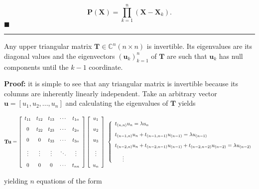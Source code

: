 \begin{equation} \mathbf{P}\left(\mathbf{X}\right) = \prod_{k=1}^n \left(\mathbf{X} - \mathbf{X}_k\right) .\end{equation}
\hfill$\blacksquare$
\vspace{5mm}
\hrule
\vspace{5mm} %
\begin{lemma}\label{lemma:triangular_inveritibility} %
	Any upper triangular matrix $\mathbf{T}\in\mathbb{C}^n{(n\times n)}$ is invertible. Its eigenvalues are its diagonal values and the eigenvectors $\left(\mathbf{u}_k\right)_{k=1}^n$ of $\mathbf{T}$ are such that $\mathbf{u}_k$ has null components until the $k-1$ coordinate.
\end{lemma}
\noindent\textbf{Proof:} it is simple to see that any triangular matrix is invertible because its columns are inherently linearly independent. Take an arbitrary vector $\mathbf{u} = \left[u_1,u_2,...,u_n\right]$ and calculating the eigenvalues of $\mathbf{T}$ yields

\begin{equation} \mathbf{Tu} = \left[\begin{array}{ccccc} t_{11} & t_{12} & t_{13} & \cdots & t_{1n} \\[3mm] 0 & t_{22} & t_{23} & \cdots & t_{2n} \\[3mm] 0 & 0 & t_{33} & \cdots & t_{3n} \\[3mm] \vdots & \vdots & \vdots & \ddots & \vdots \\[3mm] 0 & 0 & 0 & \cdots & t_{nn} \end{array}\right]\left[\begin{array}{c} u_1 \\[3mm] u_2 \\[3mm] u_3 \\[3mm] \vdots \\[3mm] u_n \end{array}\right]\ \left\{\begin{array}{l} t_{(n,n)}u_n = \lambda u_n \\[3mm] t_{(n-1,n)}u_{n} + t_{(n-1,n-1)}u_{(n-1)} = \lambda u_{(n-1)} \\[3mm] t_{(n-2,n)}u_{n} + t_{(n-2,n-1)}u_{(n-1)} + t_{(n-2,n-2)}u_{(n-2)} = \lambda u_{(n-2)} \\[3mm] \hspace{5mm} \vdots \end{array}\right. \end{equation}

	\noindent yielding $n$ equations of the form


